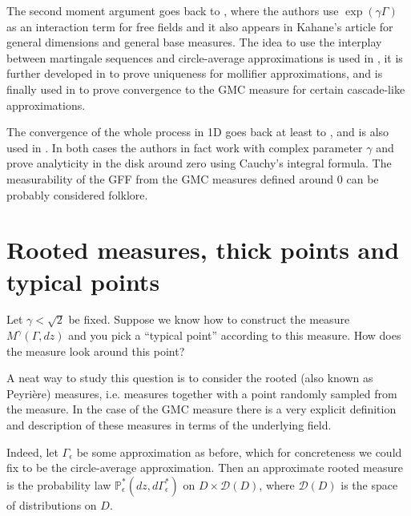 \documentclass[11pt]{amsart}
\renewcommand{\P}{\mathbb P}
\renewcommand{\1}{\mathbf 1}
\newcommand{\eps}{\epsilon}
\begin{document}
The second moment argument goes back to \cite{HK}, where the authors use $\exp(\gamma \Gamma)$ as an interaction term for free fields and it also appears in Kahane's article \cite{Kah} for general dimensions and general base measures. The idea to use the interplay between martingale sequences and circle-average approximations is used in \cite{DS}, it is further developed in \cite{Ber} to prove uniqueness for mollifier approximations, and is finally used in \cite{APS} to prove convergence to the GMC measure for certain cascade-like approximations. 

The convergence of the whole process in 1D goes back at least to \cite{Bar}, and is also used in \cite{RCW}. In both cases the authors in fact work with complex parameter $\gamma$ and prove analyticity in the disk around zero using Cauchy's integral formula. The measurability of the GFF from the GMC measures defined around $0$ can be probably considered folklore.

\section{Rooted measures, thick points and typical points}\label{sec:RM}

Let $\gamma < \sqrt{2}$ be fixed. Suppose we know how to construct the measure $M^\gamma(\Gamma,dz)$ and you pick a ``typical point'' according to this measure. How does the measure look around this point? 

A neat way to study this question is to consider the rooted (also known as Peyri\`ere) measures, i.e. measures together with a point randomly sampled from the measure. In the case of the GMC measure there is a very explicit definition and description of these measures in terms of the underlying field.

Indeed, let $\Gamma_\eps$ be some approximation as before, which for concreteness we could fix to be the circle-average approximation. Then an approximate rooted measure is the probability law $\P^*_\eps(dz,d\Gamma^*_\eps)$ on $D\times \mathcal{D}(D)$, where $\mathcal{D}(D)$ is the space of distributions on $D$. 
\end{document}
